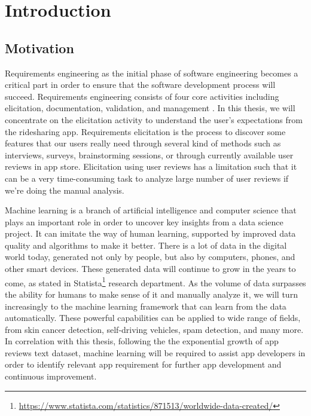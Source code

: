 \documentclass[12pt]{article}
\begin{document}
\section{Introduction}
\subsection{Motivation}
Requirements engineering as the initial phase of software engineering becomes a critical part in order to ensure that the software development process will succeed. Requirements engineering consists of four core activities including elicitation, documentation, validation, and management \cite{re_fundamentals}. In this thesis, we will concentrate on the elicitation activity to understand the user’s expectations from the ridesharing app. Requirements elicitation is the process to discover some features that our users really need through several kind of methods such as interviews, surveys, brainstorming sessions, or through currently available user reviews in app store. Elicitation using user reviews has a limitation such that it can be a very time-consuming task to analyze large number of user reviews if we’re doing the manual analysis.

Machine learning is a branch of artificial intelligence and computer science that plays an important role in order to uncover key insights from a data science project. It can imitate the way of human learning, supported by improved data quality and algorithms to make it better. There is a lot of data in the digital world today, generated not only by people, but also by computers, phones, and other smart devices. These generated data will continue to grow in the years to come, as stated in Statista\footnote{\url{https://www.statista.com/statistics/871513/worldwide-data-created/}} research department. As the volume of data surpasses the ability for humans to make sense of it and manually analyze it, we will turn increasingly to the machine learning framework that can learn from the data automatically. These powerful capabilities can be applied to wide range of fields, from skin cancer detection\cite{skin_cancer_detection}, self-driving vehicles\cite{ml_for_selfdriving_car}, spam detection\cite{ml_for_spam_detection}, and many more. In correlation with this thesis, following the the exponential growth of app reviews text dataset, machine learning will be required to assist app developers in order to identify relevant app requirement for further app development and continuous improvement.
\end{document}
